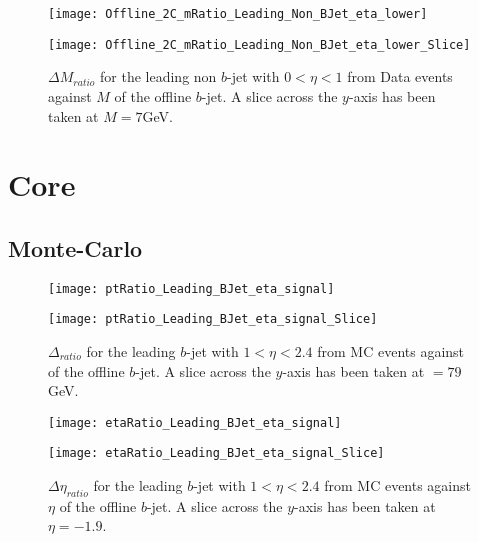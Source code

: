 		\begin{figure}[h]
			\centering
			
			\begin{minipage}[h]{0.33\linewidth}
				\texttt{[image: Offline\_2C\_mRatio\_Leading\_Non\_BJet\_eta\_lower]}
			\end{minipage}
			\quad
			\begin{minipage}[h]{0.33\linewidth}
				\texttt{[image: Offline\_2C\_mRatio\_Leading\_Non\_BJet\_eta\_lower\_Slice]}
			\end{minipage}
			\caption{$\Delta M_{ratio}$ for the leading \pt non $b$-jet with $0 < \eta < 1$ from Data events against $M$ of the offline $b$-jet. A slice across the $y$-axis has been taken at $M=7$GeV. }
			\label{fig:D:leadingnonbmcentral}
		\end{figure}

\newpage\newpage
\section{Core}

	\subsection{Monte-Carlo}

	\begin{figure}[h]
		\centering
		\begin{minipage}[h]{0.33\linewidth}
			\texttt{[image: ptRatio\_Leading\_BJet\_eta\_signal]}

		\end{minipage}
		\quad
		\begin{minipage}[h]{0.33\linewidth}
			\texttt{[image: ptRatio\_Leading\_BJet\_eta\_signal\_Slice]}
		\end{minipage}
		\caption{$\Delta $\pt$_{ratio}$ for the leading \pt $b$-jet with $1 < \eta < 2.4$ from MC events against \pt of the offline $b$-jet. A slice across the $y$-axis has been taken at \pt$=79$GeV. }
		\label{fig:MC:leadingbptcore}
	\end{figure}

	\begin{figure}[h]
		\centering

		\begin{minipage}[h]{0.33\linewidth}
			\texttt{[image: etaRatio\_Leading\_BJet\_eta\_signal]}
		\end{minipage}
		\quad
		\begin{minipage}[h]{0.33\linewidth}
			\texttt{[image: etaRatio\_Leading\_BJet\_eta\_signal\_Slice]}
		\end{minipage}
		\caption{$\Delta \eta_{ratio}$ for the leading \pt $b$-jet with $1 < \eta < 2.4$ from MC events against $\eta$ of the offline $b$-jet. A slice across the $y$-axis has been taken at $\eta=-1.9$. }
		\label{fig:MC:leadingbetacore}
	\end{figure}

